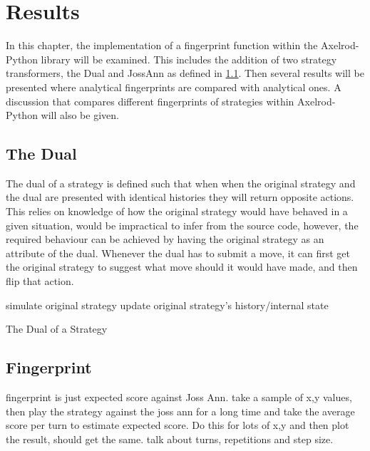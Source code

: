 
\chapter{Results}\label{cha:results}

In this chapter, the implementation of a fingerprint function within the Axelrod-Python library will be examined.
This includes the addition of two strategy transformers, the Dual and JossAnn as defined in \ref{}. %
Then several results will be presented where analytical fingerprints are compared with analytical ones.
A discussion that compares different fingerprints of strategies within Axelrod-Python will also be given.

\section{The Dual}
The dual of a strategy is defined such that when when the original strategy and the dual are presented with identical histories they will return opposite actions.
This relies on knowledge of how the original strategy would have behaved in a given situation, would be impractical to infer from the source code, however, the required behaviour can be achieved by having the original strategy as an attribute of the dual.
Whenever the dual has to submit a move, it can first get the original strategy to suggest what move should it would have made, and then flip that action.

\IncMargin{1.2em}
\begin{algorithm}[H]
  simulate original strategy\;
  update original strategy's history/internal state\;
 \caption{The Dual of a Strategy}
\end{algorithm}\DecMargin{1.5em}

\section{Fingerprint}\label{cha:fingerprint-implementation}

fingerprint is just expected score against Joss Ann.
take a sample of x,y values, then play the strategy against the joss ann for a long time and take the average score per turn to estimate expected score.
Do this for lots of x,y and then plot the result, should get the same.
talk about turns, repetitions and step size.

